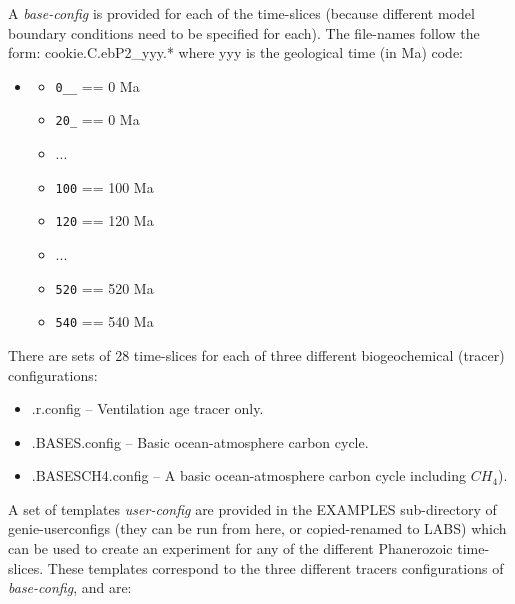 \vspace{1mm}
A \textit{base-config} is provided for each of the time-slices (because different model boundary conditions need to be specified for each). The file-names follow the form: \textsf{\footnotesize cookie.C.ebP2\_yyy.*} where \textsf{\footnotesize yyy} is the geological time (in Ma) code: 

\vspace{1mm}
\small\begin{itemize}[noitemsep]
\item []
\begin{itemize}[noitemsep]
\item \texttt{0\_\_} == 0 Ma
\item \texttt{20\_} == 0 Ma
\item [] ...
\item \texttt{100} == 100 Ma
\item \texttt{120} == 120 Ma
\item [] ...
\item \texttt{520} == 520 Ma
\item \texttt{540} == 540 Ma
\end{itemize}
\end{itemize}\normalsize

\vspace{1mm}
\noindent There are sets of 28 time-slices for each of three different biogeochemical (tracer) configurations:

\begin{itemize}[noitemsep]
\vspace{1mm}
\item [] \textsf{\footnotesize *.r.config} -- Ventilation age tracer only.
\vspace{1mm}
\item [] \textsf{\footnotesize *.BASES.config} -- Basic ocean-atmosphere carbon cycle.
\vspace{1mm}
\item [] \textsf{\footnotesize *.BASESCH4.config} -- A basic ocean-atmosphere carbon cycle including $CH_{4}$).
\end{itemize}

\vspace{1mm}
\noindent A set of templates \textit{user-config} are provided in the \textsf{\footnotesize EXAMPLES} sub-directory of \textsf{\footnotesize genie-userconfigs} (they can be run from here, or copied-renamed to \textsf{\footnotesize LABS}) which can be used to create an experiment for any of the different Phanerozoic time-slices. These templates correspond to the three different tracers configurations of \textit{base-config}, and are:

